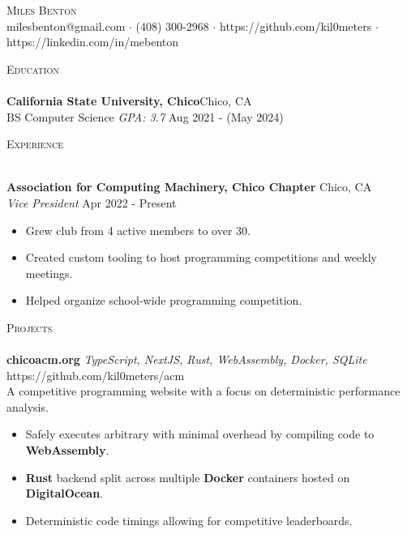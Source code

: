 \documentclass[a4paper]{article}
\newcommand{\lineunder} {
    \vspace*{-8pt} \\
    \hspace*{-18pt} \hrulefill \\
}
\newcommand{\header} [1] {
    {\hspace*{-18pt}\vspace*{6pt} \textsc{#1}}
    \vspace*{-6pt} \lineunder
}
\begin{document}
\vspace*{-40pt}



\vspace*{-10pt}
\begin{center}
	{\Huge \scshape {Miles Benton}}\\
	milesbenton@gmail.com $\cdot$ (408) 300-2968 $\cdot$ https://github.com/kil0meters $\cdot$ https://linkedin.com/in/mebenton\\
\end{center}

\header{Education}
\textbf{California State University, Chico}\hfill Chico, CA\\
BS Computer Science \textit{GPA: 3.7} \hfill Aug 2021 - (May 2024)\\
\vspace{2mm}

\header{Experience}
\vspace{1mm}

\textbf{Association for Computing Machinery, Chico Chapter} \hfill Chico, CA\\
\textit{Vice President} \hfill Apr 2022 - Present\\
\vspace{-1mm}
\begin{itemize} \itemsep 1pt
	\item Grew club from 4 active members to over 30.
	\item Created custom tooling to host programming competitions and weekly meetings.
  \item Helped organize school-wide programming competition.
\end{itemize}

\header{Projects}
{\textbf{chicoacm.org}} {\sl TypeScript, NextJS, Rust, WebAssembly, Docker, SQLite} \hfill https://github.com/kil0meters/acm\\
A competitive programming website with a focus on deterministic performance analysis.\\
    \begin{itemize}
      \item Safely executes arbitrary with minimal overhead by compiling code to \textbf{WebAssembly}.
      \item \textbf{Rust} backend split across multiple \textbf{Docker} containers hosted on \textbf{DigitalOcean}.
      \item Deterministic code timings allowing for competitive leaderboards.
    \end{itemize}
\end{document}
